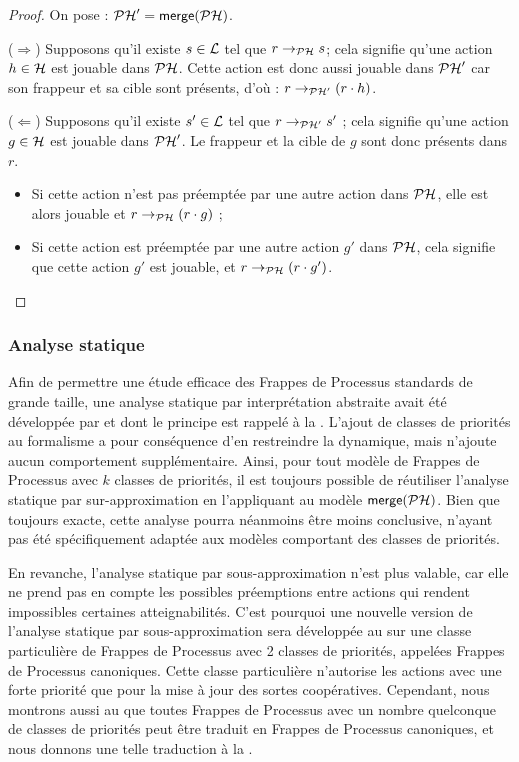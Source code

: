 \begin{proof}
  On pose : $\mathcal{PH}' = \mathsf{merge}(\mathcal{PH})$.

  ($\Rightarrow$) Supposons qu'il existe $s \in \mathcal{L}$ tel que $r \rightarrow_{\mathcal{PH}} s$;
    cela signifie qu'une action $h \in \mathcal{H}$ est jouable dans $\mathcal{PH}$.
    Cette action est donc aussi jouable dans $\mathcal{PH}'$ car son frappeur et sa cible sont présents,
    d'où : $r \rightarrow_{\mathcal{PH}'} (r \cdot h)$.
    
  ($\Leftarrow$) Supposons qu'il existe $s' \in \mathcal{L}$ tel que $r \rightarrow_{\mathcal{PH}'} s'$ ;
    cela signifie qu'une action $g \in \mathcal{H}$ est jouable dans $\mathcal{PH}'$.
    Le frappeur et la cible de $g$ sont donc présents dans $r$.
    \begin{itemize}
      \item Si cette action n'est pas préemptée par une autre action dans $\mathcal{PH}$,
        elle est alors jouable et $r \rightarrow_{\mathcal{PH}} (r \cdot g)$ ;
      \item Si cette action est préemptée par une autre action $g'$ dans $\mathcal{PH}$,
        cela signifie que cette action $g'$ est jouable, et $r \rightarrow_{\mathcal{PH}} (r \cdot g')$.
        \qedhere
    \end{itemize}
\end{proof}

\subsubsection{Analyse statique}

Afin de permettre une étude efficace des Frappes de Processus standards de grande taille,
une analyse statique par interprétation abstraite avait été développée
par  et dont le principe est rappelé à la .
L'ajout de classes de priorités au formalisme a pour conséquence d'en restreindre la dynamique,
mais n'ajoute aucun comportement supplémentaire.
Ainsi, pour tout modèle de Frappes de Processus avec $k$ classes de priorités,
il est toujours possible de réutiliser l'analyse statique par sur-approximation
en l'appliquant au modèle $\mathsf{merge}(\mathcal{PH})$.
Bien que toujours exacte, cette analyse pourra néanmoins être moins conclusive,
n'ayant pas été spécifiquement adaptée aux modèles comportant des classes de priorités.

En revanche, l'analyse statique par sous-approximation n'est plus valable,
car elle ne prend pas en compte les possibles préemptions entre actions qui rendent
impossibles certaines atteignabilités.
C'est pourquoi une nouvelle version de l'analyse statique par sous-approximation sera développée
au 
sur une classe particulière de Frappes de Processus avec 2 classes de priorités, appelées
Frappes de Processus canoniques.
Cette classe particulière n'autorise les actions avec une forte priorité que pour la mise à jour
des sortes coopératives.
Cependant, nous montrons aussi au 
que toutes Frappes de Processus avec un nombre quelconque de classes de priorités peut être traduit
en Frappes de Processus canoniques, et nous donnons une telle traduction à la
.

